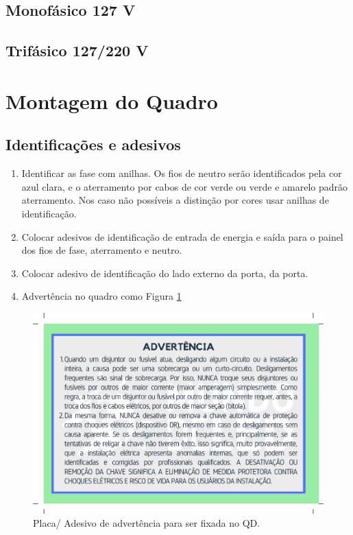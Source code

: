 \subsection{Monofásico 127 V}
\subsection{Trifásico 127/220 V}

\section{Montagem do Quadro}

\subsection{Identificações e adesivos}
\begin{enumerate}
\item Identificar as fase com anilhas. Os fios de neutro serão identificados pela cor azul clara, e o aterramento por cabos de cor verde ou verde e amarelo padrão aterramento. Nos caso não possíveis a distinção por cores usar anilhas de identificação.
\item Colocar adesivos de identificação de entrada de energia e saída para o painel dos fios de fase, aterramento e neutro.
\item  Colocar adesivo de identificação do lado externo da porta, da porta.
\item Advertência no quadro como Figura \ref{fig:advQD}
\end{enumerate}


\begin{figure}[ht]
    \centering
    \includegraphics[scale=0.5]{image/EtiqAdvQD.pdf}
    \caption{Placa/ Adesivo de advertência para ser fixada no QD.}
    \label{fig:advQD}
\end{figure}
